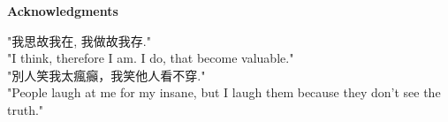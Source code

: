 



\newpage
{}



\begin{center}
\large \textbf{Acknowledgments}
\end{center}


"我思故我在, 我做故我存."\\
"I think, therefore I am. I do, that become valuable."\\

"別人笑我太瘋癲，我笑他人看不穿."\\
"People laugh at me for my insane, but I laugh them because they don't see the truth."\\



